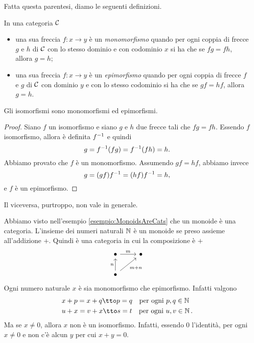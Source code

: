 Fatta questa parentesi, diamo le seguenti definizioni.

\begin{definizione}\label{definizione:MonoAndEpi}
In una categoria \(\mathcal C\)
%
\begin{itemize}
\item una sua freccia \(f : x \to y\) è un {\em monomorfismo} quando per ogni coppia di frecce \(g\) e \(h\) di \(\mathcal C\) con lo stesso dominio e con codominio \(x\) si ha che se \(fg = fh\), allora \(g = h\);
\item una sua freccia \(f : x \to y\) è un {\em epimorfismo} quando per ogni coppia di frecce \(f\) e \(g\) di \(\mathcal C\) con dominio \(y\) e con lo stesso codominio si ha che se \(gf = hf\), allora \(g = h\).
\end{itemize}
\end{definizione}

\begin{teorema}
Gli isomorfismi sono monomorfismi ed epimorfismi.
\end{teorema}

\begin{proof}
Siano \(f\) un isomorfismo e siano \(g\) e \(h\) due frecce tali che \(fg = fh\). Essendo \(f\) isomorfismo, allora è definita \(f^{-1}\) e quindi
\[g = f^{-1}(fg) = f^{-1}(fh) = h .\]
Abbiamo provato che \(f\) è un monomorfismo. Assumendo \(gf = hf\), abbiamo invece
\[g = (gf) f^{-1} = (hf) f^{-1} = h ,\]
e \(f\) è un epimorfismo.
\end{proof}

Il viceversa, purtroppo, non vale in generale.

\begin{esempio}
Abbiamo visto nell'esempio \ref{esempio:MonoidsAreCats} che un monoide è una categoria. L'insieme dei numeri naturali \(\mathbb N\) è un monoide se preso assieme all'addizione \(+\). Quindi è una categoria in cui la composizione è \(+\)
\[\begin{tikzcd}
\bullet \ar["m",r] & \bullet \\
\bullet \ar["n",u] \ar["{m+n}",ur,swap]
\end{tikzcd}\]
Ogni numero naturale \(x\) è sia monomorfismo che epimorfismo. Infatti valgono
\begin{align*}
& x + p = x + q \tto p = q \quad\text{per ogni } p, q \in \setN \\
& u + x = v + x \tto s = t \quad\text{per ogni } u, v \in \setN \,.
\end{align*}
Ma se \(x \ne 0\), allora \(x\) non è un isomorfismo. Infatti, essendo \(0\) l'identità, per ogni \(x \ne 0\) e non c'è alcun \(y\) per cui \(x + y = 0\).
\end{esempio}

